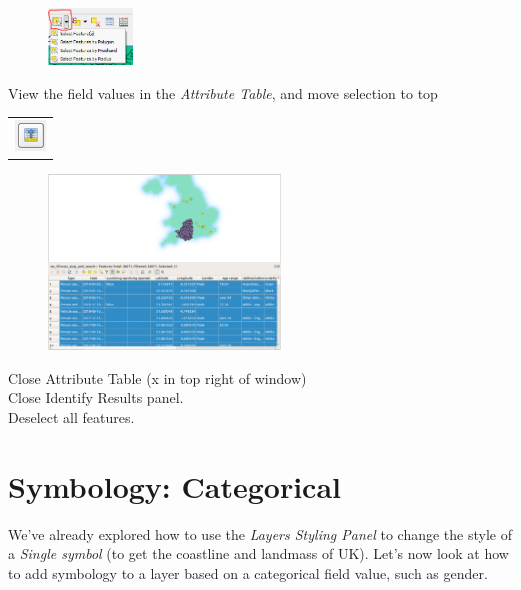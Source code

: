 \begin{figure}[!h]
	\centering
	\includegraphics[width=0.2\textwidth]{images/select_features_by_polygon_dropdown.png}
	\caption{}
	\label{ft_fig_firstfig3}
\end{figure}

View the field values in the \textit{Attribute Table}, and move selection to top
\begin{tabular}{@{}c@{}}\includegraphics[width=4ex]{images/move_selection_to_top_icon.png}\end{tabular}


\begin{figure}[!h]
	\centering
	\includegraphics[width=0.55\textwidth]{images/stop_search_select_features.png}
	\caption{}
	\label{ft_fig_firstfig3}
\end{figure}
\null\newpage

Close Attribute Table (x in top right of window)\\
Close Identify Results panel.\\
Deselect all features.\\

\section{Symbology: Categorical}

We've already explored how to use the \textit{Layers Styling Panel} to change the style of a \textit{Single symbol} (to get the coastline and landmass of UK). Let's now look at how to add symbology to a layer based on a categorical field value, such as gender.\\

